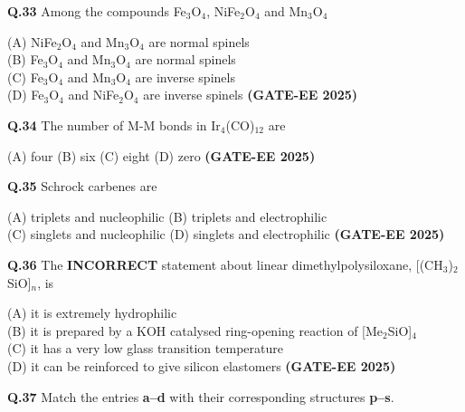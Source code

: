 \documentclass[12pt]{article}
\begin{document}
\begin{enumerate}
\vspace{0.5cm}

\textbf{Q.33} Among the compounds Fe$_3$O$_4$, NiFe$_2$O$_4$ and Mn$_3$O$_4$

(A) NiFe$_2$O$_4$ and Mn$_3$O$_4$ are normal spinels\\
(B) Fe$_3$O$_4$ and Mn$_3$O$_4$ are normal spinels\\
(C) Fe$_3$O$_4$ and Mn$_3$O$_4$ are inverse spinels\\
(D) Fe$_3$O$_4$ and NiFe$_2$O$_4$ are inverse spinels   \textbf{(GATE-EE 2025)}


\vspace{0.5cm}

\textbf{Q.34} The number of M-M bonds in Ir$_4$(CO)$_{12}$ are

(A) four \hspace{1cm}
(B) six \hspace{1cm}
(C) eight \hspace{1cm}
(D) zero   \textbf{(GATE-EE 2025)}


\vspace{0.5cm}

\textbf{Q.35} Schrock carbenes are

(A) triplets and nucleophilic \hspace{1cm}
(B) triplets and electrophilic\\
(C) singlets and nucleophilic \hspace{1cm}
(D) singlets and electrophilic   \textbf{(GATE-EE 2025)}


\vspace{0.5cm}

\textbf{Q.36} The \textbf{INCORRECT} statement about linear dimethylpolysiloxane, [(CH$_3$)$_2$SiO]$_n$, is

(A) it is extremely hydrophilic\\
(B) it is prepared by a KOH catalysed ring-opening reaction of [Me$_2$SiO]$_4$\\
(C) it has a very low glass transition temperature\\
(D) it can be reinforced to give silicon elastomers   \textbf{(GATE-EE 2025)}


\vspace{0.5cm}

\textbf{Q.37} Match the entries \textbf{a–d} with their corresponding structures \textbf{p–s}.\\[1em]


\end{enumerate}
\end{document}
